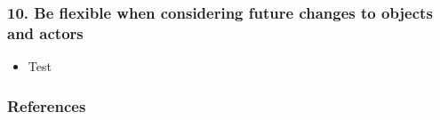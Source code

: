 \documentclass[12pt,norsk]{beamer}
\begin{document}
\begin{frame}

	\frametitle{10. Be flexible when considering future changes to objects and actors}
	\begin{itemize}
		\item Test \cite{sample}
	\end{itemize}
	
	

\end{frame}

\begin{frame}

	\frametitle{References}
		
	
		

\end{frame}




\end{document}
